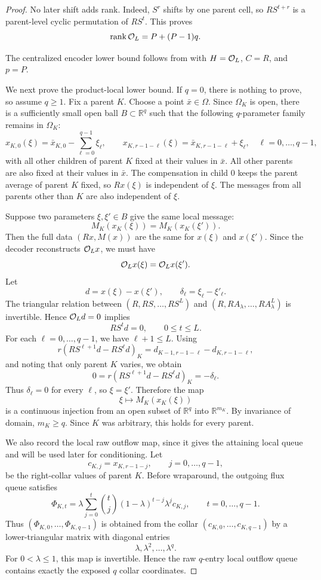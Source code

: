 \documentclass[pdflatex,sn-mathphys-num]{sn-jnl}%
\DeclareMathOperator{\rank}{rank}
\theoremstyle{thmstyleone}%
\theoremstyle{thmstyletwo}%
\theoremstyle{thmstylethree}%
\begin{document}
\begin{proof}
No later shift adds rank.  Indeed, \(S^r\) shifts by one parent cell, so
\(RS^{t+r}\) is a parent-level cyclic permutation of \(RS^t\).  This proves
\[
  \rank{\cal O}_L=P+(P-1)q.
\]

The centralized encoder lower bound follows from  with
\(H={\cal O}_L\), \(C=R\), and \(p=P\).

We next prove the product-local lower bound.  If \(q=0\), there is nothing
to prove, so assume \(q\ge1\).  Fix a parent \(K\).  Choose a point
\(\bar x\in\Omega\).  Since \(\Omega_K\) is open, there is a sufficiently
small open ball \(B\subset\mathbb R^q\) such that the following
\(q\)-parameter family remains in \(\Omega_K\):
\[
  x_{K,0}(\xi)
  =
  \bar x_{K,0}
  -
  \sum_{\ell=0}^{q-1}\xi_\ell,
  \qquad
  x_{K,r-1-\ell}(\xi)
  =
  \bar x_{K,r-1-\ell}
  +
  \xi_\ell,
  \quad
  \ell=0,\ldots,q-1,
\]
with all other children of parent \(K\) fixed at their values in \(\bar x\).
All other parents are also fixed at their values in \(\bar x\).  The
compensation in child \(0\) keeps the parent average of parent \(K\) fixed,
so \(Rx(\xi)\) is independent of \(\xi\).  The messages from all parents
other than \(K\) are also independent of \(\xi\).

Suppose two parameters \(\xi,\xi'\in B\) give the same local message:
\[
  M_K(x_K(\xi))=M_K(x_K(\xi')).
\]
Then the full data \((Rx,M(x))\) are the same for \(x(\xi)\) and
\(x(\xi')\).  Since the decoder reconstructs \({\cal O}_Lx\), we must have
\[
  {\cal O}_L x(\xi)={\cal O}_L x(\xi').
\]
Let
\[
  d=x(\xi)-x(\xi'),
  \qquad
  \delta_\ell=\xi_\ell-\xi'_\ell.
\]
The triangular relation between
\((R,RS,\ldots,RS^L)\) and
\((R,RA_\lambda,\ldots,RA_\lambda^L)\) is invertible.  Hence
\({\cal O}_Ld=0\) implies
\[
  RS^t d=0,
  \qquad
  0\le t\le L.
\]
For each \(\ell=0,\ldots,q-1\), we have \(\ell+1\le L\).  Using
\[
  r(RS^{\ell+1}d-RS^\ell d)_K
  =
  d_{K-1,r-1-\ell}-d_{K,r-1-\ell},
\]
and noting that only parent \(K\) varies, we obtain
\[
  0
  =
  r(RS^{\ell+1}d-RS^\ell d)_K
  =
  -\delta_\ell.
\]
Thus \(\delta_\ell=0\) for every \(\ell\), so \(\xi=\xi'\).  Therefore the
map
\[
  \xi\mapsto M_K(x_K(\xi))
\]
is a continuous injection from an open subset of \(\mathbb R^q\) into
\(\mathbb R^{m_K}\).  By invariance of domain, \(m_K\ge q\).  Since \(K\) was
arbitrary, this holds for every parent.

We also record the local raw outflow map, since it gives the attaining local
queue and will be used later for conditioning.  Let
\[
  c_{K,j}=x_{K,r-1-j},
  \qquad
  j=0,\ldots,q-1,
\]
be the right-collar values of parent \(K\).  Before wraparound, the outgoing
flux queue satisfies
\[
  \Phi_{K,t}
  =
  \lambda
  \sum_{j=0}^{t}
  \binom{t}{j}
  (1-\lambda)^{t-j}\lambda^j c_{K,j},
  \qquad
  t=0,\ldots,q-1.
\]
Thus \((\Phi_{K,0},\ldots,\Phi_{K,q-1})\) is obtained from the collar
\((c_{K,0},\ldots,c_{K,q-1})\) by a lower-triangular matrix with diagonal
entries
\[
  \lambda,\lambda^2,\ldots,\lambda^q.
\]
For \(0<\lambda\le1\), this map is invertible.  Hence the raw \(q\)-entry
local outflow queue contains exactly the exposed \(q\) collar coordinates.


\end{proof}
\end{document}
